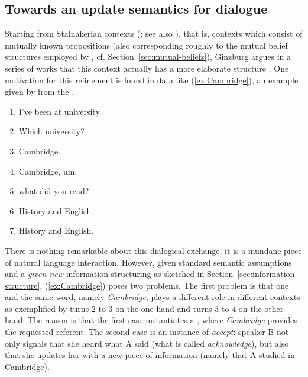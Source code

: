 \documentclass[output=paper]{langsci/langscibook}
\begin{document}
{\subsection{Towards an update semantics for dialogue}
\label{sec:dialogue-game-boards}

Starting from Stalnakerian contexts  (\citealp{Stalnaker:1978}; see also \citealp{Lewis:1979:b}), that is, contexts which consist of mutually known propositions (also corresponding roughly to the mutual belief structures employed by \citealp{Green:1996}, cf. Section~\ref{sec:mutual-beliefs}), Ginzburg argues in a series of works that this context actually has a more elaborate structure \citep{Ginzburg:1994,Ginzburg:1996,Ginzburg:1997}.
%
One motivation for this refinement is found in data like (\ref{ex:Cambridge}), an
example given by \citet[]{Ginzburg:1994} from the  \citep{Svartvik:1990}.
%
\ea \label{ex:Cambridge}
\begin{enumerate}[noitemsep]
\item {} I've been at university.
\item {} Which university?
\item {} Cambridge.
\item {} Cambridge, um.
\item \speaking{} what did you read?
\item {} History and English.
\item {} History and English.
\end{enumerate}
\z

There is nothing remarkable about this dialogical exchange, it is a mundane  piece of natural language interaction.
%
However, given standard semantic assumptions and  a \emph{given-new} information   structuring as sketched in Section~\ref{sec:information-structure},  (\ref{ex:Cambridge}) poses two problems.
%
The first problem is that one and the same word, namely \textit{Cambridge}, plays a different role in different contexts as exemplified by turns 2 to 3 on the one hand and turns 3 to 4 on the other hand.
%
The reason is that the first case instantiates a , where \textit{Cambridge} provides the requested referent.
%
The second case is an instance of \emph{accept}:  speaker B not only signals that she heard what A said (what is called \emph{acknowledge}),  but also that she updates  her  with a new piece of information (namely that A studied in Cambridge).

}
\end{document}
